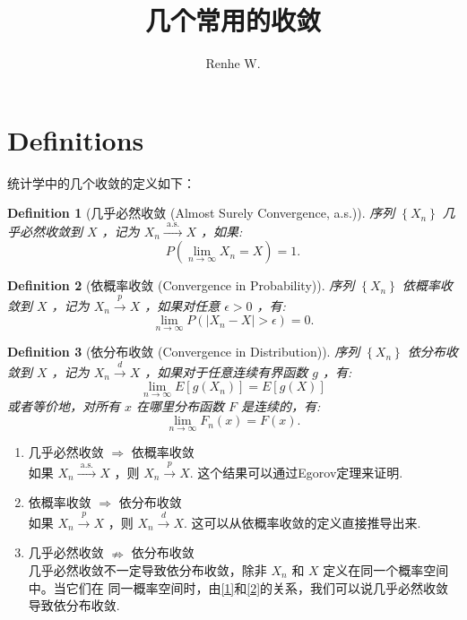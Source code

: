 \documentclass[UTF8,12pt]{ctexart}
\title{几个常用的收敛}
\author{Renhe W.}
\date{ }
\numberwithin{equation}{section}%
\newtheorem{defn}{Definition}
\begin{document}
	\maketitle
	\section{Definitions}
	统计学中的几个收敛的定义如下：
	\begin{defn}[几乎必然收敛 (Almost Surely Convergence, a.s.)]
		序列 $\left\{X_n\right\}$ 几乎必然收敛到 $X$ ，记为 $X_n \stackrel{\text { a.s. }}{\longrightarrow} X$ ，如果:
		$$
		P\left(\lim _{n \rightarrow \infty} X_n=X\right)=1.
		$$
	\end{defn}
	
	\begin{defn}[依概率收敛 (Convergence in Probability)]
		序列 $\left\{X_n\right\}$ 依概率收敛到 $X$ ，记为 $X_n \stackrel{p}{\longrightarrow} X$ ，如果对任意 $\epsilon>0$ ，有:
		$$
		\lim _{n \rightarrow \infty} P\left(\left|X_n-X\right|>\epsilon\right)=0.
		$$
	\end{defn}
	
	\begin{defn}[依分布收敛 (Convergence in Distribution)]
		序列 $\left\{X_n\right\}$ 依分布收敛到 $X$ ，记为 $X_n \stackrel{d}{\longrightarrow} X$ ，如果对于任意连续有界函数 $g$ ，有:
		$$
		\lim _{n \rightarrow \infty} E\left[g\left(X_n\right)\right]=E[g(X)]
		$$
		或者等价地，对所有 $x$ 在哪里分布函数 $F$ 是连续的，有:
		$$
		\lim _{n \rightarrow \infty} F_n(x)=F(x).
		$$
	\end{defn}
	
	\begin{tcolorbox}[enhanced,title={三者关系}]
		
		\begin{enumerate}
			\item 几乎必然收敛 $\Rightarrow$ 依概率收敛\label{1}\\
			如果 $X_n \stackrel{\text { a.s. }}{\longrightarrow} X$ ，则 $X_n \stackrel{p}{\longrightarrow} X$. 这个结果可以通过Egorov定理来证明.
			\item  依概率收敛 $\Rightarrow$ 依分布收敛\label{2}\\
			如果 $X_n \stackrel{p}{\longrightarrow} X$ ，则 $X_n \stackrel{d}{\longrightarrow} X$. 这可以从依概率收敛的定义直接推导出来.
			\item 几乎必然收敛 $\nRightarrow$ 依分布收敛\\
			几乎必然收敛不一定导致依分布收敛，除非 $X_n$ 和 $X$ 定义在同一个概率空间中。当它们在 同一概率空间时，由\ref{1}和\ref{2}的关系，我们可以说几乎必然收敛导致依分布收敛.		
		\end{enumerate}		
	\end{tcolorbox}
	
\end{document}
